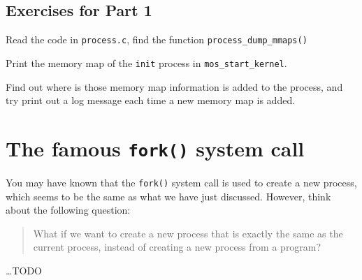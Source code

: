 \subsection{Exercises for Part 1}

\begin{exercise}
    \item Read the code in \texttt{process.c}, find the function \texttt{process\_dump\_mmaps()}
    \item Print the memory map of the \texttt{init} process in \texttt{mos\_start\_kernel}.
    \item Find out where is those memory map information is added to the process, and try
    print out a log message each time a new memory map is added.
\end{exercise}

\section{The famous \texttt{fork()} system call}

You may have known that the \texttt{fork()} system call is used to create a new process, which
seems to be the same as what we have just discussed. However, think about the following
question:

\begin{quote}
    What if we want to create a new process that is exactly the same as the current process,
    instead of creating a new process from a program?
\end{quote}

\dots TODO

